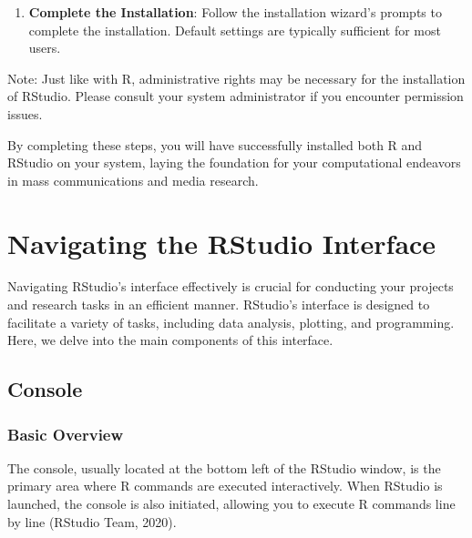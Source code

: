 \documentclass[
  b5paper]{book}
\newenvironment{Shaded}{\begin{snugshade}}{\end{snugshade}}
\newcommand{\NormalTok}[1]{#1}
\providecommand{\tightlist}{%
  \setlength{\itemsep}{0pt}\setlength{\parskip}{0pt}}
\begin{document}
\begin{enumerate}
\def\labelenumi{\arabic{enumi}.}
\setcounter{enumi}{3}
\tightlist
\item
  \textbf{Complete the Installation}: Follow the installation wizard's prompts to complete the installation. Default settings are typically sufficient for most users.
\end{enumerate}

\begin{Shaded}
\begin{Highlighting}[]
\NormalTok{Note: Just like with R, administrative rights may be necessary for the installation of RStudio. Please consult your system administrator if you encounter permission issues.}
\end{Highlighting}
\end{Shaded}

By completing these steps, you will have successfully installed both R and RStudio on your system, laying the foundation for your computational endeavors in mass communications and media research.

\hypertarget{navigating-the-rstudio-interface}{%
\section{Navigating the RStudio Interface}\label{navigating-the-rstudio-interface}}

Navigating RStudio's interface effectively is crucial for conducting your projects and research tasks in an efficient manner. RStudio's interface is designed to facilitate a variety of tasks, including data analysis, plotting, and programming. Here, we delve into the main components of this interface.

\hypertarget{console}{%
\subsection*{Console}\label{console}}

\hypertarget{basic-overview}{%
\subsubsection*{Basic Overview}\label{basic-overview}}

The console, usually located at the bottom left of the RStudio window, is the primary area where R commands are executed interactively. When RStudio is launched, the console is also initiated, allowing you to execute R commands line by line (RStudio Team, 2020).
\end{document}
